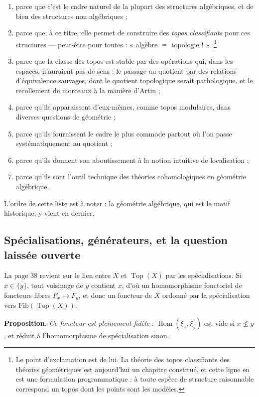 \documentclass[11pt,a4paper]{article}
\begin{document}
\begin{enumerate}
\item[a)] parce que c'est le cadre naturel de la plupart des structures
algébriques, et de bien des structures non algébriques ;
\item[b)] parce que, à ce titre, elle permet de construire des \emph{topos
classifiants} pour ces structures — peut-être pour toutes : « algèbre $=$
topologie ! » ;\footnote{Le point d'exclamation est de lui. La théorie des
topos classifiants des théories géométriques est aujourd'hui un chapitre
constitué, et cette ligne en est une formulation programmatique : à toute
espèce de structure raisonnable correspond un topos dont les points sont les
modèles.}
\item[c)] parce que la classe des topos est stable par des opérations qui, dans
les espaces, n'auraient pas de sens : le passage au quotient par des relations
d'équivalence sauvages, dont le quotient topologique serait pathologique, et le
recollement de morceaux à la manière d'Artin ;
\item[d)] parce qu'ils apparaissent d'eux-mêmes, comme topos modulaires, dans
diverses questions de géométrie ;
\item[e)] parce qu'ils fournissent le cadre le plus commode partout où l'on
passe systématiquement au quotient ;
\item[f)] parce qu'ils donnent son aboutissement à la notion intuitive de
localisation ;
\item[g)] parce qu'ils sont l'outil technique des théories cohomologiques en
géométrie algébrique.
\end{enumerate}

L'ordre de cette liste est à noter : la géométrie algébrique, qui est le motif
historique, y vient en dernier.

\subsection*{Spécialisations, générateurs, et la question laissée ouverte}

La page 38 revient sur le lien entre $X$ et $\operatorname{Top}(X)$ par les
spécialisations. Si $x \in \overline{\{y\}}$, tout voisinage de $y$ contient
$x$, d'où un homomorphisme fonctoriel de foncteurs fibres
$F_{x} \to F_{y}$, et donc un foncteur de $X$ ordonné par la spécialisation
vers $\mathrm{Fib}(\operatorname{Top}(X))$.

\textbf{Proposition.} \emph{Ce foncteur est pleinement fidèle} :
$\operatorname{Hom}(\xi_{x}, \xi_{y})$ est vide si $x \not\leq y$, et réduit à
l'homomorphisme de spécialisation sinon.
\end{document}
